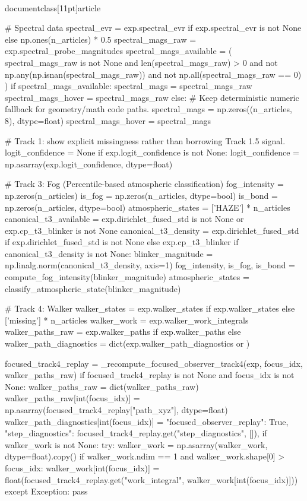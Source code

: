 \\documentclass[11pt]{article}
\begin{document}
\begin{CodeBlock}
{{{{{    # Spectral data
    spectral_evr = exp.spectral_evr if exp.spectral_evr is not None else np.ones(n_articles) * 0.5
    spectral_mags_raw = exp.spectral_probe_magnitudes
    spectral_mags_available = (
        spectral_mags_raw is not None
        and len(spectral_mags_raw) > 0
        and not np.any(np.isnan(spectral_mags_raw))
        and not np.all(spectral_mags_raw == 0)
    )
    if spectral_mags_available:
        spectral_mags = spectral_mags_raw
        spectral_mags_hover = spectral_mags_raw
    else:
        # Keep deterministic numeric fallback for geometry/math code paths.
        spectral_mags = np.zeros((n_articles, 8), dtype=float)
        spectral_mags_hover = spectral_mags

    # Track 1: show explicit missingness rather than borrowing Track 1.5 signal.
    logit_confidence = None
    if exp.logit_confidence is not None:
        logit_confidence = np.asarray(exp.logit_confidence, dtype=float)

    # Track 3: Fog (Percentile-based atmospheric classification)
    fog_intensity = np.zeros(n_articles)
    is_fog = np.zeros(n_articles, dtype=bool)
    is_bond = np.zeros(n_articles, dtype=bool)
    atmospheric_states = ['HAZE'] * n_articles
    canonical_t3_available = exp.dirichlet_fused_std is not None or exp.cp_t3_blinker is not None
    canonical_t3_density = exp.dirichlet_fused_std if exp.dirichlet_fused_std is not None else exp.cp_t3_blinker
    if canonical_t3_density is not None:
        blinker_magnitude = np.linalg.norm(canonical_t3_density, axis=1)
        fog_intensity, is_fog, is_bond = compute_fog_intensity(blinker_magnitude)
        atmospheric_states = classify_atmospheric_state(blinker_magnitude)

    # Track 4: Walker
    walker_states = exp.walker_states if exp.walker_states else ['missing'] * n_articles
    walker_work = exp.walker_work_integrals
    walker_paths_raw = exp.walker_paths if exp.walker_paths else {}
    walker_path_diagnostics = dict(exp.walker_path_diagnostics or {})

    focused_track4_replay = _recompute_focused_observer_track4(exp, focus_idx, walker_paths_raw)
    if focused_track4_replay is not None and focus_idx is not None:
        walker_paths_raw = dict(walker_paths_raw)
        walker_paths_raw[int(focus_idx)] = np.asarray(focused_track4_replay["path_xyz"], dtype=float)
        walker_path_diagnostics[int(focus_idx)] = {
            "focused_observer_replay": True,
            "step_diagnostics": focused_track4_replay.get("step_diagnostics", []),
        }
        if walker_work is not None:
            try:
                walker_work = np.asarray(walker_work, dtype=float).copy()
                if walker_work.ndim == 1 and walker_work.shape[0] > focus_idx:
                    walker_work[int(focus_idx)] = float(focused_track4_replay.get("work_integral", walker_work[int(focus_idx)]))
            except Exception:
                pass

}}}}}
\end{CodeBlock}
\end{document}

